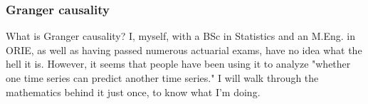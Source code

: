 \documentclass{article}
\begin{document}
\subsubsection{Granger causality}
What is Granger causality? I, myself, with a BSc in Statistics and an M.Eng. in ORIE, as well as having passed numerous actuarial exams, have no idea what the hell it is. However, it seems that people have been using it to analyze "whether one time series can predict another time series." I will walk through the mathematics behind it just once, to know what I'm doing.
\end{document}
